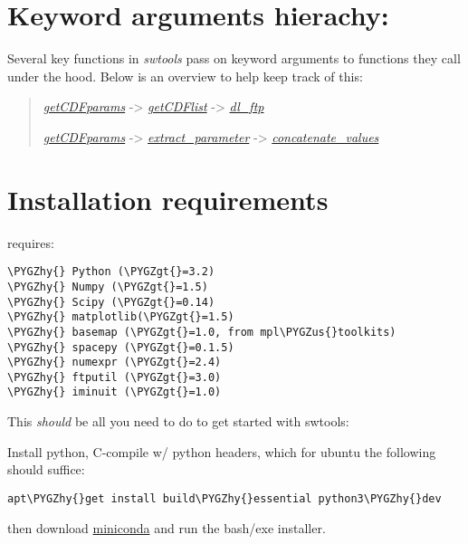 \documentclass[letterpaper,10pt,english]{sphinxhowto}
\def\PYGZus{\char`\_}
\def\PYGZgt{\char`\>}
\def\PYGZhy{\char`\-}
\begin{document}
\section{Keyword arguments hierachy:}
\label{swtools_doc:keyword-arguments-hierachy}
Several key functions in \emph{swtools} pass on keyword arguments to functions they call under the hood. Below is an overview to help keep track of this:
\begin{quote}

{\hyperref[swtools_doc:getcdfparams]{\emph{getCDFparams}}}  -\textgreater{} {\hyperref[swtools_doc:getcdflist]{\emph{getCDFlist}}}  -\textgreater{} {\hyperref[swtools_doc:dl\string-ftp]{\emph{dl\_ftp}}}

{\hyperref[swtools_doc:getcdfparams]{\emph{getCDFparams}}}  -\textgreater{} {\hyperref[swtools_doc:extract\string-parameter]{\emph{extract\_parameter}}}  -\textgreater{} {\hyperref[swtools_doc:concatenate\string-values]{\emph{concatenate\_values}}}
\end{quote}


\section{Installation requirements}
\label{install:installation-requirements}\label{install::doc}
 requires:

\begin{Verbatim}[commandchars=\\\{\}]
\PYGZhy{} Python (\PYGZgt{}=3.2)
\PYGZhy{} Numpy (\PYGZgt{}=1.5)
\PYGZhy{} Scipy (\PYGZgt{}=0.14)
\PYGZhy{} matplotlib(\PYGZgt{}=1.5)
\PYGZhy{} basemap (\PYGZgt{}=1.0, from mpl\PYGZus{}toolkits)
\PYGZhy{} spacepy (\PYGZgt{}=0.1.5)
\PYGZhy{} numexpr (\PYGZgt{}=2.4)
\PYGZhy{} ftputil (\PYGZgt{}=3.0)
\PYGZhy{} iminuit (\PYGZgt{}=1.0)
\end{Verbatim}

This \emph{should} be all you need to do to get started with swtools:

Install python, C-compile w/ python headers, which for ubuntu the following should suffice:

\begin{Verbatim}[commandchars=\\\{\}]
apt\PYGZhy{}get install build\PYGZhy{}essential python3\PYGZhy{}dev
\end{Verbatim}

then download \href{http://conda.pydata.org/miniconda.html}{miniconda} and run the bash/exe installer.
\end{document}
